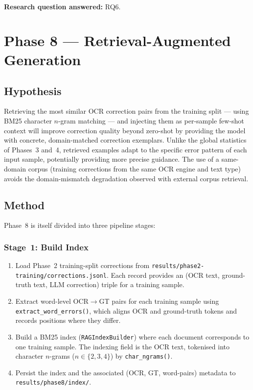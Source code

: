 \noindent
\textbf{Research question answered:} RQ6.

\section{Phase 8 --- Retrieval-Augmented Generation}
\label{sec:phase8}

\subsection{Hypothesis}
Retrieving the most similar OCR correction pairs from the training split ---
using BM25 character $n$-gram matching --- and injecting them as per-sample
few-shot context will improve correction quality beyond zero-shot by providing
the model with concrete, domain-matched correction exemplars. Unlike the
global statistics of Phases~3 and~4, retrieved examples adapt to the specific
error pattern of each input sample, potentially providing more precise
guidance. The use of a same-domain corpus (training corrections from the same
OCR engine and text type) avoids the domain-mismatch degradation observed with
external corpus retrieval.

\subsection{Method}
\label{subsec:phase8_method}

Phase~8 is itself divided into three pipeline stages:

\subsubsection{Stage~1: Build Index}

\begin{enumerate}
  \item Load Phase~2 training-split corrections from
        \texttt{results/phase2-training/corrections.jsonl}.
        Each record provides an (OCR text, ground-truth text, LLM correction)
        triple for a training sample.

  \item Extract word-level OCR$\to$GT pairs for each training sample using
        \texttt{extract\_word\_errors()}, which aligns OCR and ground-truth
        tokens and records positions where they differ.

  \item Build a BM25 index (\texttt{RAGIndexBuilder}) where each document
        corresponds to one training sample. The indexing field is the OCR
        text, tokenised into character $n$-grams ($n \in \{2, 3, 4\}$) by
        \texttt{char\_ngrams()}.

  \item Persist the index and the associated (OCR, GT, word-pairs) metadata
        to \texttt{results/phase8/index/}.
\end{enumerate}

